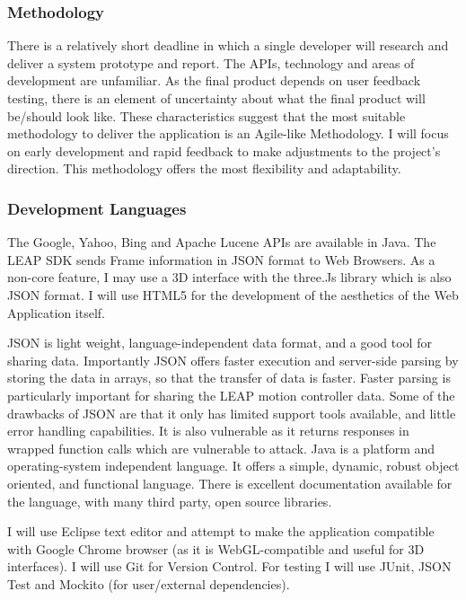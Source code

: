 \documentclass[a4paper, 10pt]{article}
\begin{document}
\subsubsection{Methodology}
There is a relatively short deadline in which a single developer will research and deliver a system prototype and report. The APIs, technology and areas of development are unfamiliar. As the final product depends on user feedback testing, there is an element of uncertainty about what the final product will be/should look like. These characteristics suggest that the most suitable methodology to deliver the application is an Agile-like Methodology. I will focus on early development and rapid feedback to make adjustments to the project's direction. This methodology offers the most flexibility and adaptability.


\subsubsection{Development Languages}
The Google, Yahoo, Bing and Apache Lucene APIs are available in Java. The LEAP SDK sends Frame information in JSON format to Web Browsers. As a non-core feature, I may use a 3D interface with the three.Js library which is also JSON format. I will use HTML5 for the development of the aesthetics of the Web Application itself.

JSON is light weight, language-independent data format, and a good tool for sharing data. Importantly JSON offers faster execution and server-side parsing by storing the data in arrays, so that the transfer of data is faster. Faster parsing is particularly important for sharing the LEAP motion controller data. Some of the drawbacks of JSON are that it only has limited support tools available, and little error handling capabilities. It is also vulnerable as it returns responses in wrapped function calls which are vulnerable to attack. Java is a platform and operating-system independent language. It offers a simple, dynamic, robust object oriented, and functional language. There is excellent documentation available for the language, with many third party, open source libraries.

I will use Eclipse text editor and attempt to make the application compatible with Google Chrome browser (as it is WebGL-compatible and useful for 3D interfaces). I will use Git for Version Control. For testing I will use JUnit, JSON Test and Mockito (for user/external dependencies).
\end{document}
